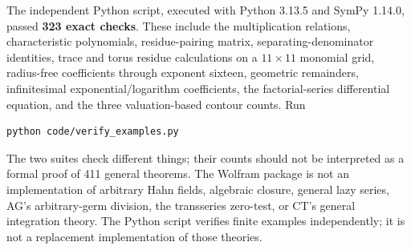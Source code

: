 \documentclass[11pt,letterpaper]{article}
\theoremstyle{definition}\newtheorem{definition}[theorem]{Definition}
\theoremstyle{remark}\newtheorem{remark}[theorem]{Remark}
\numberwithin{equation}{section}\setcounter{tocdepth}{2}
\begin{document}
The independent Python script, executed with Python 3.13.5 and SymPy 1.14.0, passed \textbf{323 exact checks}. These include the multiplication relations, characteristic polynomials, residue-pairing matrix, separating-denominator identities, trace and torus residue calculations on a $11\times11$ monomial grid, radius-free coefficients through exponent sixteen, geometric remainders, infinitesimal exponential/logarithm coefficients, the factorial-series differential equation, and the three valuation-based contour counts. Run
\par\noindent\begin{minipage}{\textwidth}
\begin{lstlisting}
python code/verify_examples.py
\end{lstlisting}
\end{minipage}\par
The two suites check different things; their counts should not be interpreted as a formal proof of 411 general theorems. The Wolfram package is not an implementation of arbitrary Hahn fields, algebraic closure, general lazy series, AG's arbitrary-germ division, the transseries zero-test, or CT's general integration theory. The Python script verifies finite examples independently; it is not a replacement implementation of those theories.
\end{document}
